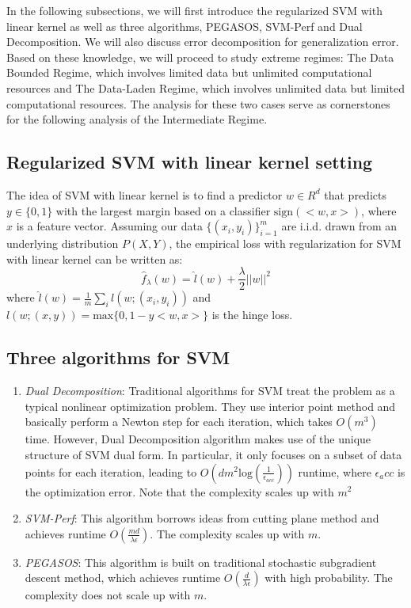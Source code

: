 \documentclass[11pt,a4paper]{article}
\begin{document}
In the following subsections, we will first introduce the regularized SVM with linear kernel as well as three algorithms, PEGASOS, SVM-Perf and Dual Decomposition. We will also discuss error decomposition for generalization error. Based on these knowledge, we will proceed to study extreme regimes: The Data Bounded Regime, which involves limited data but unlimited computational resources and The Data-Laden Regime, which involves unlimited data but limited computational resources. The analysis for these two cases serve as cornerstones for the following analysis of the Intermediate Regime.

\subsection{Regularized SVM with linear kernel setting}

The idea of SVM with linear kernel is to find a predictor $w\in R^d$ that predicts $y\in\{0,1\}$ with the largest margin based on a classifier $\mbox{sign}(<w,x>)$, where $x$ is a feature vector. Assuming our data $\{(x_i,y_i)\}_{i=1}^m$ are i.i.d. drawn from an underlying distribution $P(X,Y)$, the empirical loss with regularization for SVM with linear kernel can be written as:
\begin{equation}
\hat{f}_{\lambda}(w)=\hat{l}(w)+\frac{\lambda}{2}||w||^2
\end{equation}
where $\hat{l}(w)=\frac{1}{m}\sum_i l(w;(x_i,y_i))$ and $l(w;(x,y))=\mbox{max}\{0,1-y<w,x>\}$ is the hinge loss.

\subsection{Three algorithms for SVM}

\begin{enumerate}
\item \emph{Dual Decomposition}: Traditional algorithms for SVM treat the problem as a typical nonlinear optimization problem. They use interior point method and basically perform a Newton step for each iteration, which takes $O(m^3)$ time. However, Dual Decomposition algorithm makes use of the unique structure of SVM dual form. In particular, it only focuses on a subset of data points for each iteration, leading to $O(dm^2 \mbox{log}(\frac{1}{\epsilon_{acc}}))$ runtime, where $\epsilon_acc$ is the optimization error. Note that the complexity scales up with $m^2$
\item \emph{SVM-Perf}: This algorithm borrows ideas from cutting plane method and achieves runtime $O(\frac{md}{\lambda \epsilon})$. The complexity scales up with $m$.
\item \emph{PEGASOS}: This algorithm is built on traditional stochastic subgradient descent method, which achieves runtime $O(\frac{d}{\lambda\epsilon})$ with high probability. The complexity does not scale up with $m$.
\end{enumerate}
\end{document}
